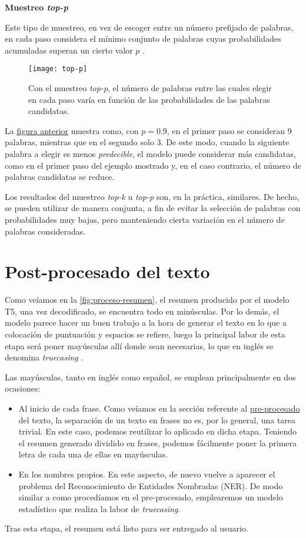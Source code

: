 \bigskip
\noindent
\textbf{Muestreo \emph{top-p}}

Este tipo de muestreo, en vez de escoger entre un número prefijado de palabras, en cada paso considera el mínimo conjunto de palabras cuyas probabilidades acumuladas superan un cierto valor $p$ \cite{holtzman20}.

\begin{figure}[!h]
	\centering
	\texttt{[image: top-p]}
	\caption{Con el muestreo \emph{top-p}, el número de palabras entre las cuales elegir en cada paso varía en función de las probabilidades de las palabras candidatas.}
	\label{top-p}
\end{figure}

La \hyperref[top-p]{figura anterior} muestra como, con $p=0.9$, en el primer paso se consideran 9 palabras, mientras que en el segundo solo 3. De este modo, cuando la siguiente palabra a elegir es menos \emph{predecible}, el modelo puede considerar más candidatas, como en el primer paso del ejemplo mostrado y, en el caso contrario, el número de palabras candidatas se reduce.

Los resultados del muestreo \emph{top-k} u \emph{top-p} son, en la práctica, similares. De hecho, se pueden utilizar de manera conjunta, a fin de evitar la selección de palabras con probabilidades muy bajas, pero manteniendo cierta variación en el número de palabras consideradas.



\section{Post-procesado del texto} \label{sec:postprocesado}

Como veíamos en la \autoref{fig:proceso-resumen}, el resumen producido por el modelo T5, una vez decodificado, se encuentra todo en minúsculas. Por lo demás, el modelo parece hacer un buen trabajo a la hora de generar el texto en lo que a colocación de puntuación y espacios se refiere, luego la principal labor de esta etapa será poner mayúsculas allí donde sean necesarias, lo que en inglés se denomina \emph{truecasing} \cite{lita03}.

Las mayúsculas, tanto en inglés como español, se emplean principalmente en dos ocasiones:

\vspace*{-\baselineskip}
\begin{itemize}
	\item [\textbullet] Al inicio de cada frase. Como veíamos en la sección referente al \hyperref[sec:preprocesado]{pre-procesado} del texto, la separación de un texto en frases no es, por lo general, una tarea trivial. En este caso, podemos reutilizar lo aplicado en dicha etapa. Teniendo el resumen generado dividido en frases, podemos fácilmente poner la primera letra de cada una de ellas en mayúsculas.
	\item [\textbullet] En los nombres propios. En este aspecto, de nuevo vuelve a aparecer el problema del Reconocimiento de Entidades Nombradas (NER). De modo similar a como procedíamos en el pre-procesado, emplearemos un modelo estadístico que realiza la labor de \emph{truecasing}.
\end{itemize}

Tras esta etapa, el resumen está listo para ser entregado al usuario.